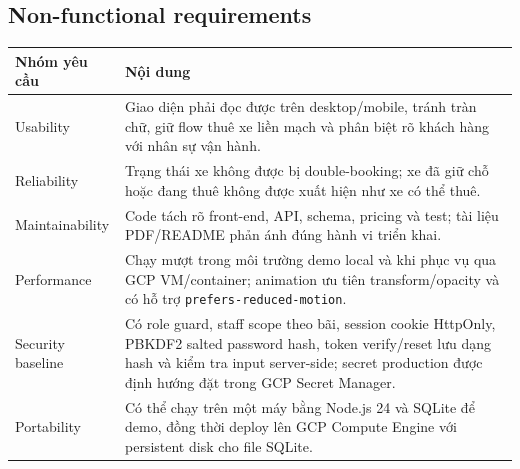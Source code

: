 \subsection{Non-functional requirements}
\begin{longtable}{P{0.20\textwidth}P{0.70\textwidth}}
\toprule
\textbf{Nhóm yêu cầu} & \textbf{Nội dung} \\
\midrule
Usability & Giao diện phải đọc được trên desktop/mobile, tránh tràn chữ, giữ flow thuê xe liền mạch và phân biệt rõ khách hàng với nhân sự vận hành. \\
Reliability & Trạng thái xe không được bị double-booking; xe đã giữ chỗ hoặc đang thuê không được xuất hiện như xe có thể thuê. \\
Maintainability & Code tách rõ front-end, API, schema, pricing và test; tài liệu PDF/README phản ánh đúng hành vi triển khai. \\
Performance & Chạy mượt trong môi trường demo local và khi phục vụ qua GCP VM/container; animation ưu tiên transform/opacity và có hỗ trợ \texttt{prefers-reduced-motion}. \\
Security baseline & Có role guard, staff scope theo bãi, session cookie HttpOnly, PBKDF2 salted password hash, token verify/reset lưu dạng hash và kiểm tra input server-side; secret production được định hướng đặt trong GCP Secret Manager. \\
Portability & Có thể chạy trên một máy bằng Node.js 24 và SQLite để demo, đồng thời deploy lên GCP Compute Engine với persistent disk cho file SQLite. \\
\bottomrule
\end{longtable}

